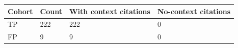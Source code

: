 \begin{tabular}{llll}
\hline
Cohort & Count & With context citations & No-context citations \\
\hline
TP & 222 & 222 & 0 \\
FP & 9 & 9 & 0 \\
\hline
\end{tabular}
\caption{Citation-style attribution in structured explanations}
